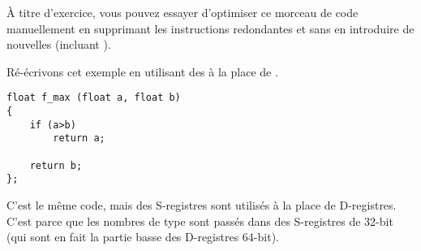 \mysubparagraph{\Exercise}

À titre d'exercice, vous pouvez essayer d'optimiser ce morceau de code manuellement
en supprimant les instructions redondantes et sans en introduire de nouvelles (incluant
).


Ré-écrivons cet exemple en utilisant des \Tfloat à la place de \Tdouble.

\begin{lstlisting}[style=customc]
float f_max (float a, float b)
{
	if (a>b)
		return a;

	return b;
};
\end{lstlisting}



C'est le même code, mais des S-registres sont utilisés à la place de D-registres.
C'est parce que les nombres de type \Tfloat sont passés dans des S-registres de 32-bit
(qui sont en fait la partie basse des D-registres 64-bit).

